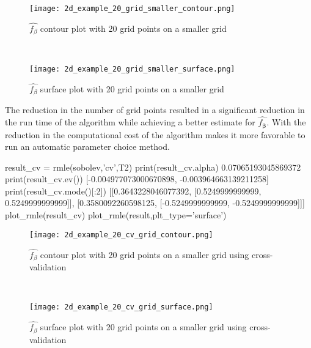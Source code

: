\documentclass[a4paper,12pt]{article}
\newcommand{\bbeta}{{\boldsymbol{\beta}}}
\begin{document}
\begin{figure}[h]
	\centering
	\begin{minipage}{0.45\textwidth}
		\centering
		\texttt{[image: 2d\_example\_20\_grid\_smaller\_contour.png]} %
		\caption{$\hat{f_\beta}$ contour plot with 20 grid points on a smaller grid}\
		\label{fig:20_smaller_cont}
	\end{minipage}\hfill
	\begin{minipage}{0.45\textwidth}
		\centering
		\texttt{[image: 2d\_example\_20\_grid\_smaller\_surface.png]} %
		\caption{$\hat{f_\beta}$ surface plot with 20 grid points on a smaller grid}
		\label{fig:20_smaller_surface}
	\end{minipage}
\end{figure}



The reduction in the number of grid points resulted in a significant reduction in the run time of the algorithm while achieving a better estimate for $\hat{f_\bbeta}$. With the reduction in the computational cost of the algorithm makes it more favorable to run an automatic parameter choice method. 

\begin{python}
result_cv = rmle(sobolev,'cv',T2)
print(result_cv.alpha)
0.07065193045869372
print(result_cv.ev())
[-0.004977073000670898, -0.003964663139211258]
print(result_cv.mode()[:2])
[[0.3643228046077392, [0.5249999999999, 0.5249999999999]],
[0.3580092260598125, [-0.5249999999999, -0.5249999999999]]]
plot_rmle(result_cv)
plot_rmle(result,plt_type='surface')
\end{python}

\begin{figure}[h]
	\centering
	\begin{minipage}{0.45\textwidth}
		\centering
		\texttt{[image: 2d\_example\_20\_cv\_grid\_contour.png]} %
		\caption{$\hat{f_\beta}$ contour plot with 20 grid points on a smaller grid using cross-validation}\
		\label{fig:20_cv_cont}
	\end{minipage}\hfill
	\begin{minipage}{0.45\textwidth}
		\centering
		\texttt{[image: 2d\_example\_20\_cv\_grid\_surface.png]} %
		\caption{$\hat{f_\beta}$ surface plot with 20 grid points on a smaller grid using cross-validation}
		\label{fig:20_cv_surface}
	\end{minipage}
\end{figure}
\end{document}
